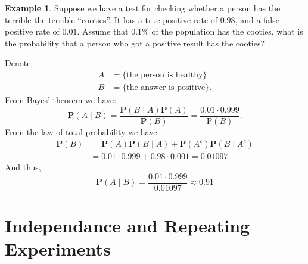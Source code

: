 \documentclass[11pt,a4paper]{article}
\theoremstyle{definition}
\newtheorem{example}{Example}[section]
\theoremstyle{plain}
\begin{document}
  \begin{example}
    Suppose we have a test for checking whether a person has the terrible 
    the terrible ``cooties''.
    It has a true positive rate of $0.98$, and a false positive rate of
    $0.01$. Assume that $0.1\%$ of the population has the cooties,
    what is the probability that a person who got a positive result
    has the cooties?

    Denote,
    \begin{align*}
      A &= \{\text{the person is healthy}\} \\
      B &= \{\text{the answer is positive}\}.
    \end{align*}
    From Bayes' theorem we have:
    \[
      \mathbf{P}(A \mid B) = 
      {\frac{\mathbf{P}(B \mid A)\mathbf{P}(A)}{\mathbf{P}(B)}} = 
      {\frac{0.01\cdot0.999}{\mathrm{P}(B)}}.
    \]
    From the law of total probability we have
    \begin{align*}
      \mathbf{P}(B) &= 
      \mathbf{P}(A)\mathbf{P}(B \mid A) + 
      \mathbf{P}(A^{c})\mathbf{P}(B \mid A^{c}) \\ &= 
      0.01\cdot0.999+0.98\cdot0.001=0.01097.
    \end{align*}
    And thus,
    \[ \mathbf{P}(A \mid B)={\frac{0.01\cdot0.999}{0.01097}} \approx 0.91 \]
  \end{example}


  \newpage

  \section{Independance and Repeating Experiments}
  
\end{document}

